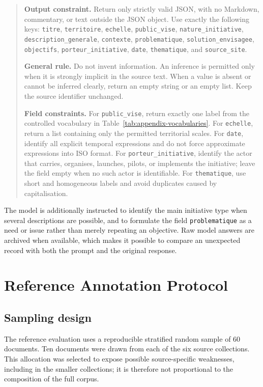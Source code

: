 \begin{quote}\small
\textbf{Output constraint.} Return only strictly valid JSON, with no Markdown,
commentary, or text outside the JSON object. Use exactly the following keys:
\texttt{titre}, \texttt{territoire}, \texttt{echelle}, \texttt{public\_vise},
\texttt{nature\_initiative}, \texttt{description\_generale},
\texttt{contexte}, \texttt{problematique}, \texttt{solution\_envisagee},
\texttt{objectifs}, \texttt{porteur\_initiative}, \texttt{date},
\texttt{thematique}, and \texttt{source\_site}.

\medskip
\textbf{General rule.} Do not invent information. An inference is permitted
only when it is strongly implicit in the source text. When a value is absent or
cannot be inferred clearly, return an empty string or an empty list. Keep the
source identifier unchanged.

\medskip
\textbf{Field constraints.} For \texttt{public\_vise}, return exactly one
label from the controlled vocabulary in Table~\ref{tab:appendix-vocabularies}.
For \texttt{echelle}, return a list containing only the permitted territorial
scales. For \texttt{date}, identify all explicit temporal expressions and do
not force approximate expressions into ISO format. For
\texttt{porteur\_initiative}, identify the actor that carries, organises,
launches, pilots, or implements the initiative; leave the field empty when no
such actor is identifiable. For \texttt{thematique}, use short and homogeneous
labels and avoid duplicates caused by capitalisation.
\end{quote}

The model is additionally instructed to identify the main initiative type when
several descriptions are possible, and to formulate the field
\texttt{problematique} as a need or issue rather than merely repeating an
objective. Raw model answers are archived when available, which makes it
possible to compare an unexpected record with both the prompt and the original
response.

\chapter{Reference Annotation Protocol}

\section{Sampling design}

The reference evaluation uses a reproducible stratified random sample of 60
documents. Ten documents were drawn from each of the six source collections.
This allocation was selected to expose possible source-specific weaknesses,
including in the smaller collections; it is therefore not proportional to the
composition of the full corpus.

